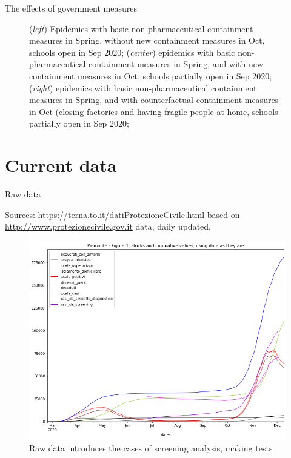 \documentclass[8pt]{beamer}
\begin{document}
\begin{frame}{The effects of government measures}
\begin{figure}[H]
\caption{(\emph{left}) Epidemics with basic non-pharmaceutical containment measures in Spring, without new containment measures in Oct, schools open in Sep 2020;
 (\emph{center}) epidemics with basic non-pharmaceutical containment measures in Spring, and with new containment measures in Oct, schools partially open in Sep 2020;
 (\emph{right}) epidemics with basic non-pharmaceutical containment measures in Spring, and with counterfactual containment measures in Oct (closing factories and having fragile people at home, schools partially open in Sep 2020;} 
\label{gov}
\end{figure}

\end{frame}

\section{Current data}

\begin{frame}{Raw data}

Sources: \url{https://terna.to.it/datiProtezioneCivile.html}  based on \url{http://www.protezionecivile.gov.it} data, daily updated.

\begin{figure}[H]
\center
\includegraphics[scale=0.26]{rawCurrent2.png}

\caption{Raw data introduces the cases of screening analysis, making tests} 
\label{rawCurrent}
\end{figure}

\end{frame}
\end{document}
